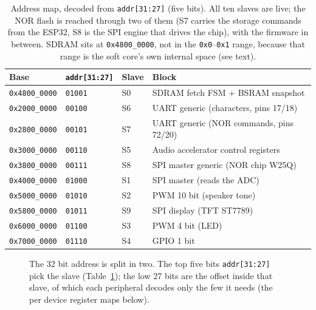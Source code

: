 \documentclass[a4paper,11pt]{article}
\begin{document}
\begin{table}[H]
\centering
\caption{Address map, decoded from \texttt{addr[31:27]} (five bits). All ten slaves
are live; the NOR flash is reached through two of them (S7 carries the storage
commands from the ESP32, S8 is the SPI engine that drives the chip), with the
firmware in between. SDRAM sits at \texttt{0x4800\_0000}, not in the
\texttt{0x0}--\texttt{0x1} range, because that range is the soft core's own
internal space (see text).}
\label{tab:addrmap}
\begin{tabular}{llll}
\toprule
\textbf{Base} & \texttt{addr[31:27]} & \textbf{Slave} & \textbf{Block} \\
\midrule
\texttt{0x4800\_0000} & \texttt{01001} & S0 & SDRAM fetch FSM + BSRAM snapshot \\
\texttt{0x2000\_0000} & \texttt{00100} & S6 & UART generic (characters, pins 17/18) \\
\texttt{0x2800\_0000} & \texttt{00101} & S7 & UART generic (NOR commands, pins 72/20) \\
\texttt{0x3000\_0000} & \texttt{00110} & S5 & Audio accelerator control registers \\
\texttt{0x3800\_0000} & \texttt{00111} & S8 & SPI master generic (NOR chip W25Q) \\
\texttt{0x4000\_0000} & \texttt{01000} & S1 & SPI master (reads the ADC) \\
\texttt{0x5000\_0000} & \texttt{01010} & S2 & PWM 10 bit (speaker tone) \\
\texttt{0x5800\_0000} & \texttt{01011} & S9 & SPI display (TFT ST7789) \\
\texttt{0x6000\_0000} & \texttt{01100} & S3 & PWM 4 bit (LED) \\
\texttt{0x7000\_0000} & \texttt{01110} & S4 & GPIO 1 bit \\
\bottomrule
\end{tabular}
\end{table}

\begin{figure}[H]
\centering
{}
\caption{The 32 bit address is split in two. The top five bits \texttt{addr[31:27]}
pick the slave (Table~\ref{tab:addrmap}); the low 27 bits are the offset inside
that slave, of which each peripheral decodes only the few it needs (the per device
register maps below).}
\label{fig:addrfield}
\end{figure}
\end{document}
